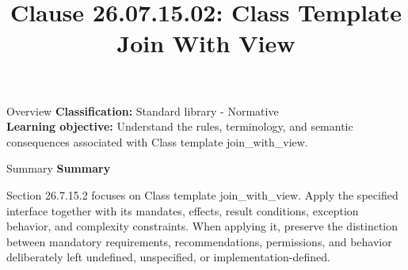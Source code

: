 \documentclass[10pt,letterpaper]{article}
\title{Clause 26.07.15.02: Class Template Join With View}
\author{}
\date{}
\begin{document}
\maketitle
\begin{CornellOverviewBox}{Overview}
\textbf{Classification:} Standard library - Normative\\[2pt]
\textbf{Learning objective:} Understand the rules, terminology, and semantic consequences associated with Class template join\_with\_view.
\end{CornellOverviewBox}\begin{CornellSummaryBox}{Summary}
{\sffamily\bfseries\color{Accent} Summary}\par\vspace{3pt}Section 26.7.15.2 focuses on Class template join\_with\_view. Apply the specified interface together with its mandates, effects, result conditions, exception behavior, and complexity constraints. When applying it, preserve the distinction between mandatory requirements, recommendations, permissions, and behavior deliberately left undefined, unspecified, or implementation-defined.
\end{CornellSummaryBox}
\end{document}
